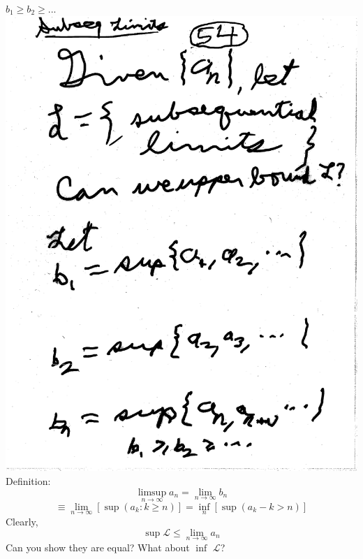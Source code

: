 \documentclass[10pt,a4paper]{article}
\begin{document}
{{\newline
$b_1 \geq b_2 \geq ...$
\newline
\includegraphics[scale=.5]{Pages/LC_1}
\newpage
Definition: $$\limsup_{n \rightarrow \infty} a_n = \lim_{n \rightarrow \infty} b_n$$
\newline
$$\equiv \lim_{n\rightarrow \infty} [\sup (a_k : k\geq n)]
= \inf_{n} [\sup (a_k -k > n)]$$
\newline
Clearly,
\newline
$$\sup \mathcal{L} \leq \lim_{n \rightarrow \infty} a_n$$
\newline
Can you show they are equal?
\newline
What about $\inf$ $\mathcal{L}$?
\newline
}}
\end{document}

